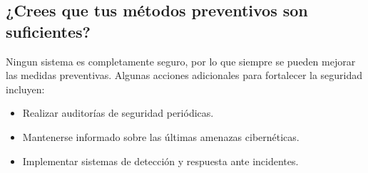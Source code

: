 \subsection{¿Crees que tus métodos preventivos son suficientes?}
Ningun sistema es completamente seguro, por lo que siempre se pueden mejorar las medidas preventivas. Algunas acciones adicionales para fortalecer la seguridad incluyen:
\begin{itemize}
    \item Realizar auditorías de seguridad periódicas.
    \item Mantenerse informado sobre las últimas amenazas cibernéticas.
    \item Implementar sistemas de detección y respuesta ante incidentes.
\end{itemize}
